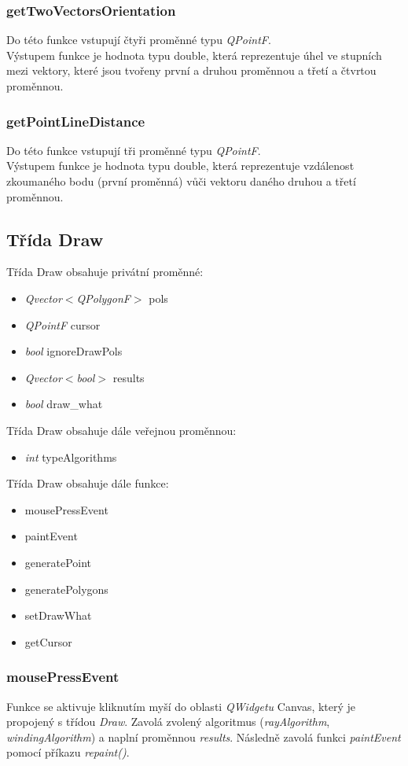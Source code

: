 \documentclass{article}
\begin{document}
\subsubsection{getTwoVectorsOrientation}
Do této funkce vstupují čtyři proměnné typu \emph{QPointF}.\\
Výstupem funkce je hodnota typu double, která reprezentuje úhel ve stupních mezi vektory, které jsou tvořeny první a druhou proměnnou a třetí a čtvrtou proměnnou.

\subsubsection{getPointLineDistance}
Do této funkce vstupují tři proměnné typu \emph{QPointF}.\\
Výstupem funkce je hodnota typu double, která reprezentuje vzdálenost zkoumaného bodu (první proměnná) vůči vektoru daného druhou a třetí proměnnou.

\newpage
\subsection{Třída Draw \label{sec:draw}}
Třída Draw obsahuje privátní proměnné:
\begin{itemize}
\item \emph{Qvector$<$QPolygonF$>$} pols
\item \emph{QPointF} cursor
\item \emph{bool} ignoreDrawPols
\item \emph{Qvector$<$bool$>$} results
\item \emph{bool} draw\_what
\end{itemize}

Třída Draw obsahuje dále veřejnou proměnnou:
\begin{itemize}
\item \emph{int} typeAlgorithms
\end{itemize}

Třída Draw obsahuje dále funkce:
\begin{itemize}
\item mousePressEvent
\item paintEvent
\item generatePoint
\item generatePolygons
\item setDrawWhat
\item getCursor
\end{itemize}

\subsubsection{mousePressEvent}
Funkce se aktivuje kliknutím myší do oblasti \emph{QWidgetu} Canvas, který je propojený s třídou \emph{Draw}. Zavolá zvolený algoritmus (\emph{rayAlgorithm},\emph{ windingAlgorithm}) a naplní proměnnou \emph{results}. Následně zavolá funkci \emph{paintEvent} pomocí příkazu \emph{repaint()}.
\end{document}
